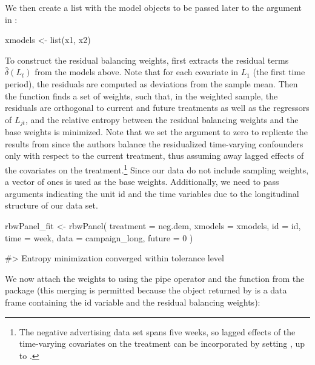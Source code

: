 We then create a list with the model objects to be passed later to the
 argument in :

\begin{Schunk}
\begin{Sinput}
xmodels <- list(x1, x2)
\end{Sinput}
\end{Schunk}

To construct the residual balancing weights,  first
extracts the residual terms \(\hat{\delta}(L_{t})\) from the models
above. Note that for each covariate in \(L_{1}\) (the first time
period), the residuals are computed as deviations from the sample mean.
Then the function finds a set of weights, such that, in the weighted
sample, the residuals are orthogonal to current and future treatments as
well as the regressors of \(L_{jt}\), and the relative entropy between
the residual balancing weights and the base weights is minimized. Note
that we set the  argument to zero to replicate the results
from \citet{zhouResidualBalancingMethod2020a} since the authors balance
the residualized time-varying confounders only with respect to the
current treatment, thus assuming away lagged effects of the covariates
on the treatment.\footnote{The negative advertising data set spans five
  weeks, so lagged effects of the time-varying covariates on the
  treatment can be incorporated by setting , up to
  .} Since our data do not include sampling weights, a
vector of ones is used as the base weights. Additionally, we need to
pass arguments indicating the unit id and the time variables due to the
longitudinal structure of our data set.

\begin{Schunk}
\begin{Sinput}
rbwPanel_fit <- rbwPanel(
  treatment = neg.dem,
  xmodels = xmodels,
  id = id,
  time = week,
  data = campaign_long,
  future = 0
)
\end{Sinput}
\begin{Soutput}
#> Entropy minimization converged within tolerance level
\end{Soutput}
\end{Schunk}

We now attach the weights to  using the pipe
operator and the  function from the package
 (this merging is permitted because the 
object returned by  is a data frame containing the id
variable and the residual balancing weights):

